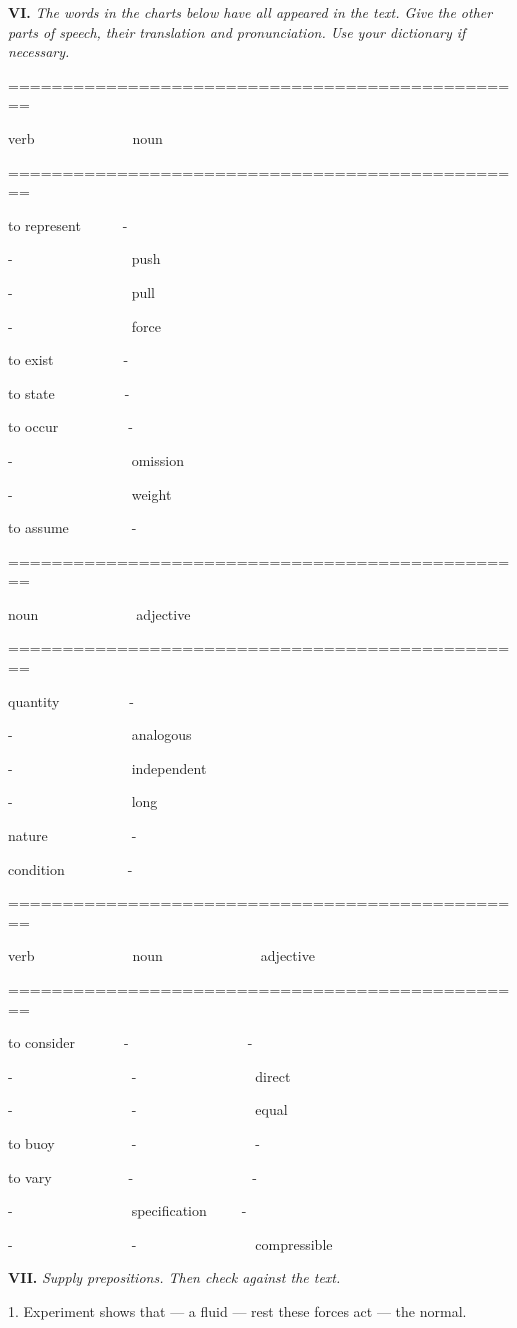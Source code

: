 \documentclass[a4paper]{article}
\newcommand{\ETask}[2]{\medskip\par\textbf{#1.} \textit{#2}\par}
\newcommand{\ETypeWr}[1]{\par\begin{ttfamily}#1\end{ttfamily}\par}
\begin{document}
\ETask{VI}{The words in the charts below have all appeared in the text. Give the other parts of speech, their translation and
pronunciation. Use your dictionary if necessary.}
\ETypeWr{
================================================

verb~~~~~~~~~~~~~~noun

================================================

to represent~~~~~~-

-~~~~~~~~~~~~~~~~~push

-~~~~~~~~~~~~~~~~~pull

-~~~~~~~~~~~~~~~~~force

to exist~~~~~~~~~~-

to state~~~~~~~~~~-

to occur~~~~~~~~~~-

-~~~~~~~~~~~~~~~~~omission

-~~~~~~~~~~~~~~~~~weight

to assume~~~~~~~~~-

================================================

noun~~~~~~~~~~~~~~adjective

================================================

quantity~~~~~~~~~~-

-~~~~~~~~~~~~~~~~~analogous

-~~~~~~~~~~~~~~~~~independent

-~~~~~~~~~~~~~~~~~long

nature~~~~~~~~~~~~-

condition~~~~~~~~~-

================================================

verb~~~~~~~~~~~~~~noun~~~~~~~~~~~~~~adjective

================================================

to consider~~~~~~~-~~~~~~~~~~~~~~~~~-

-~~~~~~~~~~~~~~~~~-~~~~~~~~~~~~~~~~~direct

-~~~~~~~~~~~~~~~~~-~~~~~~~~~~~~~~~~~equal

to buoy~~~~~~~~~~~-~~~~~~~~~~~~~~~~~-

to vary~~~~~~~~~~~-~~~~~~~~~~~~~~~~~-

-~~~~~~~~~~~~~~~~~specification~~~~~-

-~~~~~~~~~~~~~~~~~-~~~~~~~~~~~~~~~~~compressible
}

\ETask{VII}{Supply prepositions. Then check against the text.}
1. Experiment shows that --- a fluid --- rest these forces act --- the normal.
\end{document}
